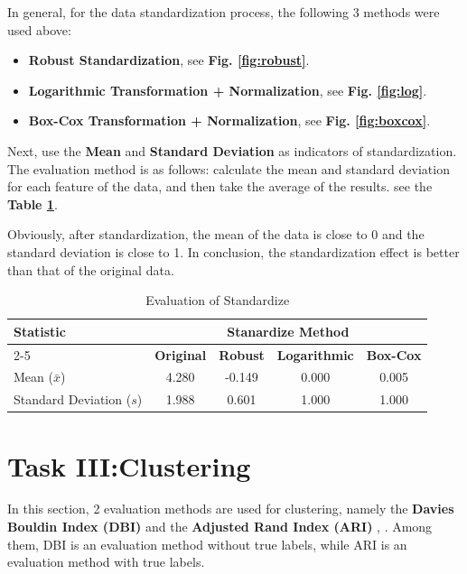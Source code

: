 \documentclass[conference]{IEEEtran}
\begin{document}
In general, for the data standardization process, the following 3 methods were used above: 
\begin{itemize}
    \item \textbf{Robust Standardization}, see \textbf{Fig. \ref{fig:robust}}.
    \item \textbf{Logarithmic Transformation + Normalization}, see \textbf{Fig. \ref{fig:log}}.
    \item \textbf{Box-Cox Transformation + Normalization}, see \textbf{Fig. \ref{fig:boxcox}}.
\end{itemize}

Next, use the \textbf{Mean} and \textbf{Standard Deviation} as indicators of standardization.
The evaluation method is as follows: calculate the mean and standard deviation for each feature of the data, and then take the average of the results. see the \textbf{Table \ref{tab:standardizeEvaluation}}. 

Obviously, after standardization, the mean of the data is close to 0 and the standard deviation is close to 1. In conclusion, the standardization effect is better than that of the original data. 
\begin{table}[h!]
    \centering
    \caption{Evaluation of Standardize}
    \label{tab:standardizeEvaluation}
    \begin{tabular}{lcccc}
        \toprule
        \multirow{2}{*}{\textbf{Statistic}} & \multicolumn{4}{c}{\textbf{Stanardize Method}} \\
       \cmidrule(lr){2-5}
        & \textbf{Original} & \textbf{Robust} & \textbf{Logarithmic} & \textbf{Box-Cox} \\
       \midrule
        Mean (\(\bar{x}\)) & 4.280 & -0.149 & 0.000 & 0.005 \\
        Standard Deviation (\(s\)) & 1.988 & 0.601 & 1.000 & 1.000 \\
        \bottomrule
        \end{tabular}
\end{table}

\section{\textbf{Task III:Clustering}}
In this section, 2 evaluation methods are used for clustering, namely the \textbf{Davies Bouldin Index (DBI)} and the \textbf{Adjusted Rand Index (ARI)} \cite{hubert1985comparing}, \cite{davies2009cluster}.
Among them, DBI is an evaluation method without true labels, while ARI is an evaluation method with true labels. 
\end{document}
